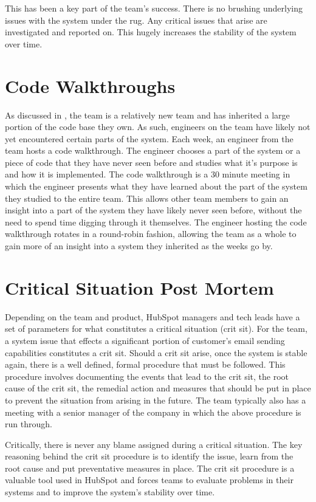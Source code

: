This has been a key part of the \team{} team's success. There is no brushing underlying issues with the system under the rug. Any critical issues that arise are investigated and reported on. This hugely increases the stability of the system over time. 

\section{Code Walkthroughs}
As discussed in , the \team{} team is a relatively new team and has inherited a large portion of the code base they own. As such, engineers on the team have likely not yet encountered certain parts of the system. Each week, an engineer from the team hosts a code walkthrough. The engineer chooses a part of the system or a piece of code that they have never seen before and studies what it's purpose is and how it is implemented. The code walkthrough is a 30 minute meeting in which the engineer presents what they have learned about the part of the system they studied to the entire team. This allows other team members to gain an insight into a part of the system they have likely never seen before, without the need to spend time digging through it themselves. The engineer hosting the code walkthrough rotates in a round-robin fashion, allowing the team as a whole to gain more of an insight into a system they inherited as the weeks go by. 

\section{Critical Situation Post Mortem}
Depending on the team and product, HubSpot managers and tech leads have a set of parameters for what constitutes a critical situation (crit sit). For the \team{} team, a system issue that effects a significant portion of customer's email sending capabilities constitutes a crit sit. Should a crit sit arise, once the system is stable again, there is a well defined, formal procedure that must be followed. This procedure involves documenting the events that lead to the crit sit, the root cause of the crit sit, the remedial action and measures that should be put in place to prevent the situation from arising in the future. The team typically also has a meeting with a senior manager of the company in which the above procedure is run through.

Critically, there is never any blame assigned during a critical situation. The key reasoning behind the crit sit procedure is to identify the issue, learn from the root cause and put preventative measures in place. The crit sit procedure is a valuable tool used in HubSpot and forces teams to evaluate problems in their systems and to improve the system's stability over time.

